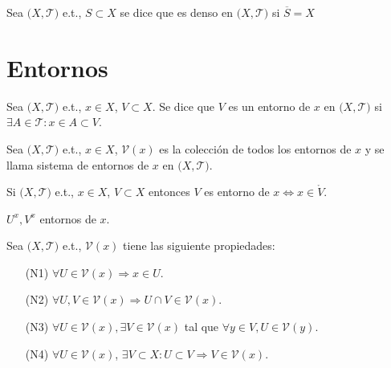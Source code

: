 \begin{defn}
  Sea $\big( X, \mathcal{T} \big)$ e.t., $S \subset X$ se dice que es denso en $\big( X, \mathcal{T} \big)$ si $\overline{S} = X$
\end{defn}

\section{Entornos}

\begin{defn}
  Sea $\big( X, \mathcal{T} \big)$ e.t., $x \in X$, $V \subset X$. Se dice que $V$ es un entorno de $x$ en $\big( X, \mathcal{T} \big)$ si $\exists A \in \mathcal{T}: x \in A \subset V$.
\end{defn}

\begin{defn}
  Sea $\big( X, \mathcal{T} \big)$ e.t., $x \in X$, $\mathcal{V}(x)$ es la colección de todos los entornos de $x$ y se llama sistema de entornos de $x$ en $\big( X, \mathcal{T} \big)$.
\end{defn}

\begin{obs}
  Si $\big( X, \mathcal{T} \big)$ e.t., $x \in X$, $V \subset X$ entonces $V$ es entorno de $x \Leftrightarrow x \in \mathring{V}$.
\end{obs}

\begin{nota}
  $U^{x}, V^{x}$ entornos de $x$.
\end{nota}

\begin{prop}
  Sea $\big( X, \mathcal{T} \big)$ e.t., $\mathcal{V}(x)$ tiene las siguiente propiedades:
  \begin{enumerate}[label=(\roman*)]
    \item [(N1)] $\forall U \in \mathcal{V}(x) \Rightarrow x \in U$.
    \item [(N2)] $\forall U,V \in \mathcal{V}(x) \Rightarrow U \cap V \in \mathcal{V}(x)$.
    \item [(N3)]$\forall U \in \mathcal{V}(x), \exists V \in \mathcal{V}(x)$ tal que $\forall y \in V, U \in \mathcal{V}(y)$.
    \item [(N4)]$\forall U \in \mathcal{V}(x)$, $ \exists V \subset X: U \subset V \Rightarrow V \in \mathcal{V}(x)$.
  \end{enumerate}
\end{prop}

